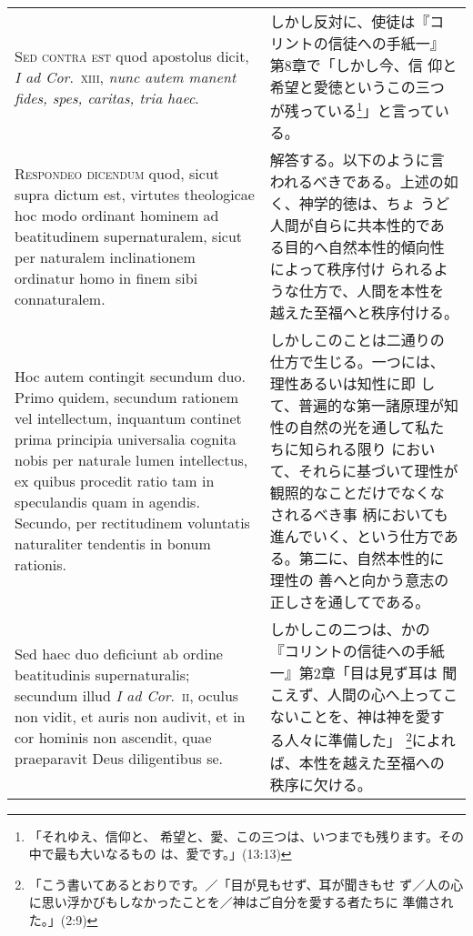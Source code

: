 \documentclass[10pt]{jsarticle}
\begin{document}
\begin{longtable}{p{21em}p{21em}}
\\



{\scshape Sed contra est} quod apostolus dicit, {\itshape I ad
Cor}.~{\scshape xiii}, {\itshape nunc autem manent fides, spes,
caritas, tria haec}.

&

 しかし反対に、使徒は『コリントの信徒への手紙一』第8章で「しかし今、信
 仰と希望と愛徳というこの三つが残っている\footnote{「それゆえ、信仰と、
 希望と、愛、この三つは、いつまでも残ります。その中で最も大いなるもの
 は、愛です。」(13:13)}」と言っている。\label{fides_spes_caritas}
 
\\



{\scshape Respondeo dicendum} quod, sicut supra dictum est, virtutes
theologicae hoc modo ordinant hominem ad beatitudinem supernaturalem,
sicut per naturalem inclinationem ordinatur homo in finem sibi
 connaturalem.


&

 解答する。以下のように言われるべきである。上述の如く、神学的徳は、ちょ
 うど人間が自らに共本性的である目的へ自然本性的傾向性によって秩序付け
 られるような仕方で、人間を本性を越えた至福へと秩序付ける。
 
\\

 Hoc autem contingit secundum duo. Primo quidem, secundum rationem vel
intellectum, inquantum continet prima principia universalia cognita
nobis per naturale lumen intellectus, ex quibus procedit ratio tam in
speculandis quam in agendis. Secundo, per rectitudinem voluntatis
naturaliter tendentis in bonum rationis.

&

 しかしこのことは二通りの仕方で生じる。一つには、理性あるいは知性に即
 して、普遍的な第一諸原理が知性の自然の光を通して私たちに知られる限り
 において、それらに基づいて理性が観照的なことだけでなくなされるべき事
 柄においても進んでいく、という仕方である。第二に、自然本性的に理性の
 善へと向かう意志の正しさを通してである。

 
\\


Sed haec duo deficiunt ab ordine beatitudinis supernaturalis; secundum
illud {\itshape I ad Cor}.~{\scshape ii}, oculus non vidit, et auris
non audivit, et in cor hominis non ascendit, quae praeparavit Deus
diligentibus se.


&

 しかしこの二つは、かの『コリントの信徒への手紙一』第2章「目は見ず耳は
 聞こえず、人間の心へ上ってこないことを、神は神を愛する人々に準備した」
 \footnote{「こう書いてあるとおりです。／「目が見もせず、耳が聞きもせ
 ず／人の心に思い浮かびもしなかったことを／神はご自分を愛する者たちに
 準備された。」(2:9)}によれば、本性を越えた至福への秩序に欠ける。
 

\end{longtable}
\end{document}
